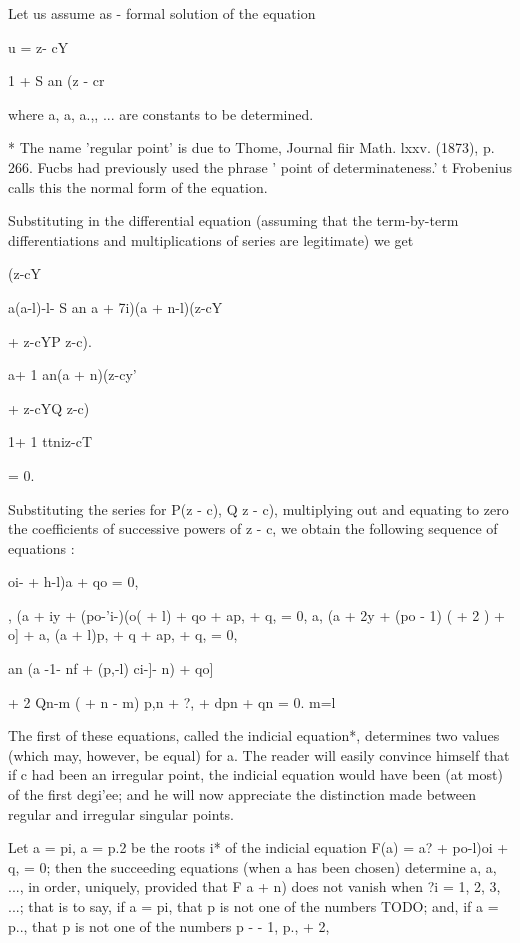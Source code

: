 Let us assume as - formal solution of the equation

u = z- cY

1 + S an (z - cr

where a, a, a.,, ... are constants to be determined.

* The name 'regular point' is due to Thome, Journal fiir Math. lxxv.
(1873), p. 266. Fucbs had previously used the phrase ' point of
determinateness.' t Frobenius calls this the normal form of the
equation.

%
%

Substituting in the differential equation (assuming that the
term-by-term differentiations and multiplications of series are
legitimate) we get

(z-cY

a(a-l)-l- S an a + 7i)(a + n-l)(z-cY

+ z-cYP z-c).

a+ 1 an(a + n)(z-cy'

+ z-cYQ z-c)

1+ 1 ttniz-cT

= 0.

Substituting the series for P(z - c), Q z - c), multiplying out and
equating to zero the coefficients of successive powers of z - c, we
obtain the following sequence of equations :

oi- + h-l)a + qo = 0,

, (a + iy + (po-'i-)(o( + l) + qo + ap, + q, = 0, a, (a + 2y + (po -
1) ( + 2 ) + o] + a, (a + l)p, + q + ap, + q, = 0,

an (a -1- nf + (p,-l) ci-]- n) + qo]

+ 2 Qn-m ( + n - m) p,n + ?, + dpn + qn = 0. m=l

The first of these equations, called the indicial equation*,
determines two values (which may, however, be equal) for a. The reader
will easily convince himself that if c had been an irregular point,
the indicial equation would have been (at most) of the first degi'ee;
and he will now appreciate the distinction made between regular and
irregular singular points.

Let a = pi, a = p.2 be the roots i* of the indicial equation F(a) = a?
+ po-l)oi + q, = 0; then the succeeding equations (when a has been
chosen) determine a, a, ..., in order, uniquely, provided that F a +
n) does not vanish when ?i = 1, 2, 3, ...; that is to say, if a = pi,
that p is not one of the numbers TODO; and, if a =
p.., that p is not one of the numbers p - - 1, p., + 2,

